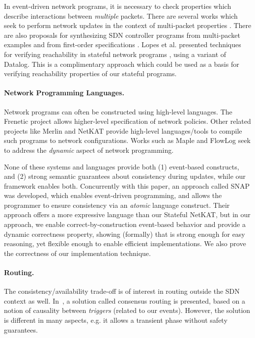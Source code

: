 \documentclass[pldi-cameraready]{sigplanconf}
\begin{document}
In event-driven network programs, it is necessary to check properties
which describe interactions between {\em multiple} packets.
There are several works which seek to perform
network updates in the context of multi-packet
properties \cite{ghorbani2014towards}
\cite{liu2015inter}.
There are also proposals for synthesizing SDN controller programs from
multi-packet examples \cite{yuan2015netegg} and from first-order
specifications \cite{padon2015decentralizing}. Lopes et al. 
presented techniques for verifying reachability in stateful network
programs \cite{lopes2015checking}, using a variant of Datalog. This
is a complimentary approach which could be used as a basis for
verifying reachability properties of our stateful programs.
 


\balance



\paragraph{Network Programming Languages.}
Network programs can often be constructed using high-level languages.
The Frenetic project
\cite{foster2011frenetic}
\cite{monsanto2012compiler}
\cite{foster2013languages}
allows higher-level specification of network policies.
Other related projects like Merlin \cite{soule2014merlin}
and NetKAT \cite{smolka2015} 
\cite{beckett2015temporal}
provide high-level languages/tools to compile such programs to network configurations.
Works such as
Maple
\cite{voellmy2013maple} and
FlowLog \cite{nelson2014tierless}
seek to address the {\em dynamic} aspect of network programming.




None of these systems and languages provide both (1) event-based constructs,
and (2) strong semantic guarantees about
consistency during updates, while our framework enables both.
Concurrently with this paper, an approach called SNAP \cite{arashloo2015snap}
was developed, which enables event-driven programming, and allows the
programmer to ensure consistency via an {\em atomic} language construct.
Their approach offers a more expressive language than our Stateful
NetKAT, but in our approach, we enable 
correct-by-construction event-based behavior and provide a dynamic
correctness property, showing (formally) that is strong enough for easy reasoning, 
yet flexible enough to enable efficient implementations.
We also prove the correctness of our implementation technique.


\paragraph{Routing.} The consistency/availability trade-off
is of interest in routing outside the SDN context as
well. In~\cite{JKKAV08}, a solution called consensus routing is presented, based on
a notion of causality between {\em triggers} (related to our
events). However, the solution is different in many aspects, e.g.
it allows a transient phase without safety guarantees.
\end{document}

